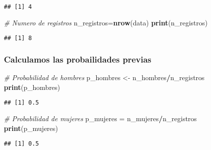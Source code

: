 \documentclass[]{article}
\newenvironment{Shaded}{\begin{snugshade}}{\end{snugshade}}
\newcommand{\KeywordTok}[1]{\textcolor[rgb]{0.13,0.29,0.53}{\textbf{#1}}}
\newcommand{\DataTypeTok}[1]{\textcolor[rgb]{0.13,0.29,0.53}{#1}}
\newcommand{\StringTok}[1]{\textcolor[rgb]{0.31,0.60,0.02}{#1}}
\newcommand{\CommentTok}[1]{\textcolor[rgb]{0.56,0.35,0.01}{\textit{#1}}}
\newcommand{\OperatorTok}[1]{\textcolor[rgb]{0.81,0.36,0.00}{\textbf{#1}}}
\newcommand{\NormalTok}[1]{#1}
\begin{document}
\begin{verbatim}
## [1] 4
\end{verbatim}

\begin{Shaded}
\begin{Highlighting}[]
\CommentTok{# Numero de registros}
\NormalTok{n_registros=}\KeywordTok{nrow}\NormalTok{(data)}
\KeywordTok{print}\NormalTok{(n_registros)}
\end{Highlighting}
\end{Shaded}

\begin{verbatim}
## [1] 8
\end{verbatim}

\subsubsection{Calculamos las probailidades
previas}\label{calculamos-las-probailidades-previas}

\begin{Shaded}
\begin{Highlighting}[]
\CommentTok{# Probabilidad de hombres}
\NormalTok{p_hombres <-}\StringTok{ }\NormalTok{n_hombres}\OperatorTok{/}\NormalTok{n_registros}
\KeywordTok{print}\NormalTok{(p_hombres)}
\end{Highlighting}
\end{Shaded}

\begin{verbatim}
## [1] 0.5
\end{verbatim}

\begin{Shaded}
\begin{Highlighting}[]
\CommentTok{# Probabilidad de mujeres}
\NormalTok{p_mujeres =}\StringTok{ }\NormalTok{n_mujeres}\OperatorTok{/}\NormalTok{n_registros}
\KeywordTok{print}\NormalTok{(p_mujeres)}
\end{Highlighting}
\end{Shaded}

\begin{verbatim}
## [1] 0.5
\end{verbatim}

\begin{Shaded}
\end{Shaded}
\end{document}
